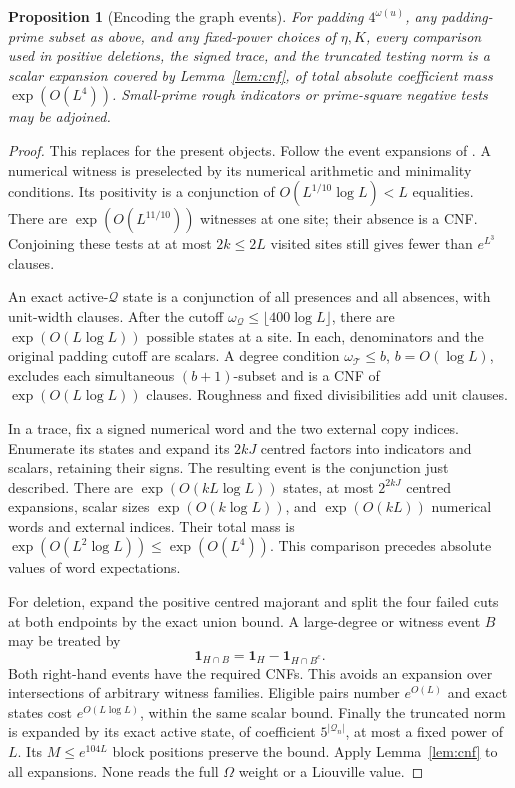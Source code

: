 \documentclass[11pt]{article}
\newtheorem{proposition}[theorem]{Proposition}
\theoremstyle{definition}
\newcommand{\ind}{\mathbf 1}
\theoremstyle{remark}
\numberwithin{equation}{section}
\newcommand{\Qset}{\mathcal Q}
\begin{document}
\begin{proposition}[Encoding the graph events]\label{prop:encoding}
For padding $4^{\omega(u)}$, any padding-prime subset as above, and any fixed-power choices of $\eta,K$, every
comparison used in positive deletions, the signed trace, and the truncated testing norm is a scalar expansion
covered by Lemma~\ref{lem:cnf}, of total absolute coefficient mass $\exp(O(L^4))$.
Small-prime rough indicators or prime-square negative tests may be adjoined.
\end{proposition}
\begin{proof}
This replaces \cite[Lemma~3.1 and Corollaries~3.2--3.3, pp.~10--12]{OpenAI007} for the present objects.
Follow the event expansions of \cite[Lemma~4.6, pp.~19--21; Theorem~5.4, pp.~24--25;
Proposition~8.4, pp.~41--42]{OpenAI007}.
A numerical witness is preselected by its numerical arithmetic and minimality conditions.
Its positivity is a conjunction of $O(L^{1/10}\log L)<L$ equalities. There are
$\exp(O(L^{11/10}))$ witnesses at one site; their absence is a CNF. Conjoining these tests at at most
$2k\le2L$ visited sites still gives fewer than $e^{L^3}$ clauses.

An exact active-$\Qset$ state is a conjunction of all presences and all absences, with unit-width clauses.
After the cutoff $\omega_{\Qset}\le\lfloor400\log L\rfloor$, there are
$\exp(O(L\log L))$ possible states at a site. In each, denominators and the original padding cutoff are scalars.
A degree condition $\omega_{\mathcal T}\le b$, $b=O(\log L)$, excludes each simultaneous $(b+1)$-subset and is a
CNF of $\exp(O(L\log L))$ clauses. Roughness and fixed divisibilities add unit clauses.

In a trace, fix a signed numerical word and the two external copy indices. Enumerate its states and expand its
$2kJ$ centred factors into indicators and scalars, retaining their signs. The resulting event is the conjunction
just described. There are $\exp(O(kL\log L))$ states, at most $2^{2kJ}$ centred expansions, scalar sizes
$\exp(O(k\log L))$, and $\exp(O(kL))$ numerical words and external indices.
Their total mass is $\exp(O(L^2\log L))\le\exp(O(L^4))$.
This comparison precedes absolute values of word expectations.

For deletion, expand the positive centred majorant and split the four failed cuts at both endpoints by the
exact union bound. A large-degree or witness event $B$ may be treated by
\begin{equation}\label{eq:two-cnf}
 \ind_{H\cap B}=\ind_H-\ind_{H\cap B^c}.
\end{equation}
Both right-hand events have the required CNFs. This avoids an expansion over intersections of arbitrary witness
families. Eligible pairs number $e^{O(L)}$ and exact states cost $e^{O(L\log L)}$, within the same scalar bound.
Finally the truncated norm is expanded by its exact active state, of coefficient $5^{|\Qset_n|}$, at most a fixed
power of $L$. Its $M\le e^{104L}$ block positions preserve the bound.
Apply Lemma~\ref{lem:cnf} to all expansions. None reads the full $\Omega$ weight or a Liouville value.
\end{proof}
\end{document}
